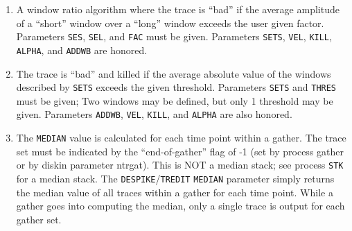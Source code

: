 \begin{enumerate}
\item  A window ratio algorithm where the trace is ``bad'' if the average
    amplitude of a ``short'' window over a ``long'' window exceeds the
    user given factor.  Parameters \texttt{SES}, \texttt{SEL}, and \texttt{FAC} must be given.
    Parameters \texttt{SETS}, \texttt{VEL}, \texttt{KILL}, \texttt{ALPHA}, and \texttt{ADDWB} are honored.

\item  The trace is ``bad'' and killed if the average absolute value of
    the windows described by \texttt{SETS} exceeds the given threshold.
    Parameters \texttt{SETS} and \texttt{THRES} must be given; Two windows may be defined,
    but only 1 threshold may be given.  Parameters \texttt{ADDWB}, \texttt{VEL}, \texttt{KILL},
    and \texttt{ALPHA} are also honored.

\item  The \texttt{MEDIAN} value is calculated for each time point within a \gls{gather}.
    The trace set must be indicated by the ``end-of-gather'' flag of -1
    (set by process gather or by diskin parameter ntrgat).  This is NOT
    a median stack; see process \texttt{STK} for a median stack.  The
    \texttt{DESPIKE}/\texttt{TREDIT} \texttt{MEDIAN} parameter simply returns the median value of
    all traces within a \gls{gather} for each time point.  While a gather
    goes into computing the median, only a single trace is output for
    each \gls{gather} set.


\end{enumerate}
